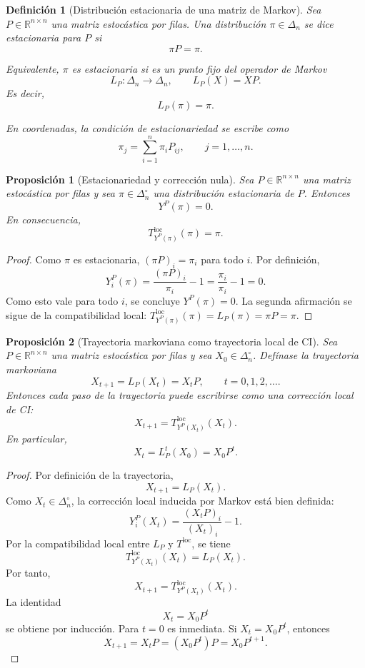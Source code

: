 \documentclass[12pt]{article}
\newtheorem{definicion}{Definición}[section]
\newtheorem{proposicion}{Proposición}[section]
\begin{document}
\begin{definicion}[Distribución estacionaria de una matriz de Markov]
Sea \(P\in\mathbb{R}^{n\times n}\) una matriz estocástica por filas. 
Una distribución \(\pi\in\Delta_n\) se dice \emph{estacionaria} para \(P\) si
\[
\pi P=\pi.
\]

Equivalente, \(\pi\) es estacionaria si es un punto fijo del operador de Markov
\[
L_P:\Delta_n\longrightarrow\Delta_n,
\qquad
L_P(X)=XP.
\]
Es decir,
\[
L_P(\pi)=\pi.
\]

En coordenadas, la condición de estacionariedad se escribe como
\[
\pi_j
=
\sum_{i=1}^{n}\pi_iP_{ij},
\qquad
j=1,\dots,n.
\]
\end{definicion}

\begin{proposicion}[Estacionariedad y corrección nula]
Sea \(P\in\mathbb{R}^{n\times n}\) una matriz estocástica por filas y sea
\(\pi\in\Delta_n^\circ\) una distribución estacionaria de \(P\). Entonces
\[
Y^P(\pi)=0.
\]
En consecuencia,
\[
T^{\mathrm{loc}}_{Y^P(\pi)}(\pi)=\pi.
\]
\end{proposicion}

\begin{proof}
Como $\pi$ es estacionaria, $(\pi P)_i = \pi_i$ para todo $i$. Por definición,
\[
Y_i^P(\pi)
=
\frac{(\pi P)_i}{\pi_i}-1
=
\frac{\pi_i}{\pi_i}-1
=
0.
\]
Como esto vale para todo $i$, se concluye $Y^P(\pi)=0$.
La segunda afirmación se sigue de la compatibilidad local:
$T^{\mathrm{loc}}_{Y^P(\pi)}(\pi)=L_P(\pi)=\pi P=\pi$.
\end{proof}

\begin{proposicion}[Trayectoria markoviana como trayectoria local de CI]
Sea \(P\in\mathbb{R}^{n\times n}\) una matriz estocástica por filas y sea
\(X_0\in\Delta_n^\circ\). Defínase la trayectoria markoviana
\[
X_{t+1}=L_P(X_t)=X_tP,
\qquad t=0,1,2,\dots.
\]
Entonces cada paso de la trayectoria puede escribirse como una corrección local de CI:
\[
X_{t+1}
=
T^{\mathrm{loc}}_{Y^P(X_t)}(X_t).
\]
En particular,
\[
X_t=L_P^t(X_0)=X_0P^t.
\]
\end{proposicion}

\begin{proof}
Por definición de la trayectoria,
\[
X_{t+1}=L_P(X_t).
\]
Como \(X_t\in\Delta_n^\circ\), la corrección local inducida por Markov está bien definida:
\[
Y_i^P(X_t)
=
\frac{(X_tP)_i}{(X_t)_i}-1.
\]
Por la compatibilidad local entre \(L_P\) y \(T^{\mathrm{loc}}\), se tiene
\[
T^{\mathrm{loc}}_{Y^P(X_t)}(X_t)=L_P(X_t).
\]
Por tanto,
\[
X_{t+1}
=
T^{\mathrm{loc}}_{Y^P(X_t)}(X_t).
\]
La identidad
\[
X_t=X_0P^t
\]
se obtiene por inducción. Para \(t=0\) es inmediata. Si \(X_t=X_0P^t\), entonces
\[
X_{t+1}=X_tP=(X_0P^t)P=X_0P^{t+1}.
\]
\end{proof}
\end{document}
